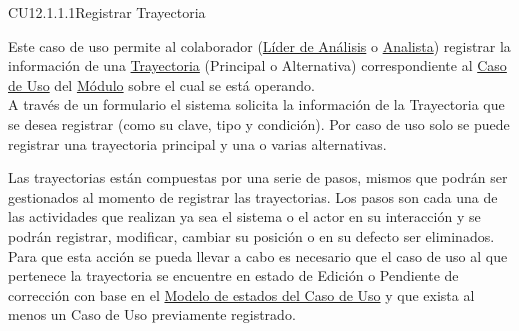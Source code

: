 	\begin{UseCase}{CU12.1.1.1}{Registrar Trayectoria}{
			
		Este caso de uso permite al colaborador (\hyperlink{jefe}{Líder de Análisis} o \hyperlink{analista}{Analista}) registrar la información de una \hyperlink{entidadTray}{Trayectoria} (Principal o Alternativa) correspondiente al \hyperlink{casoUso}{Caso de Uso} del \hyperlink{moduloEntidad}{Módulo} sobre el cual se está operando.\\
		
		A través de un formulario el sistema solicita la información de la Trayectoria que se desea registrar (como su clave, tipo y condición). Por caso de uso solo se puede registrar una trayectoria principal y una o varias alternativas.
		
		Las trayectorias están compuestas por una serie de pasos, mismos que podrán ser gestionados al momento de registrar las trayectorias. Los pasos son cada una de las actividades que realizan ya sea el sistema o el actor en su interacción y se podrán registrar, modificar, cambiar su posición o en su defecto ser eliminados. \\
		
		Para que esta acción se pueda llevar a cabo es necesario que el caso de uso al que pertenece la trayectoria se encuentre en estado de Edición o Pendiente de corrección con base en el \hyperlink{edoCU}{Modelo de estados del Caso de Uso} y que exista al menos un Caso de Uso previamente registrado.
	
}
\end{UseCase}
